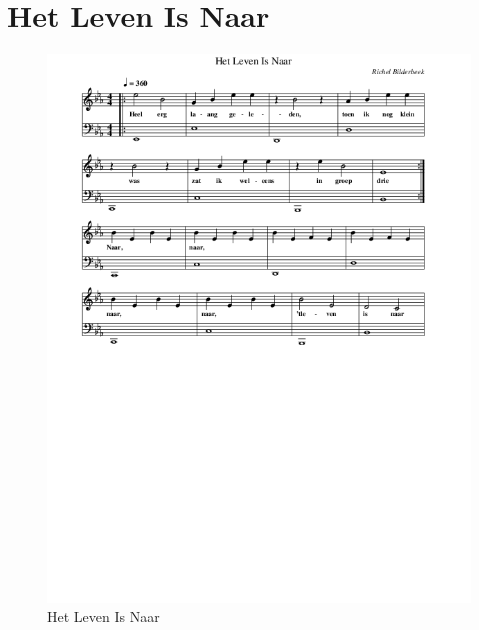 \section{Het Leven Is Naar}



\begin{figure}[!htbp]
  \includegraphics[width=\textwidth,height=\textheight,keepaspectratio]{../songs/18_het_leven_is_naar.png}
  \caption{Het Leven Is Naar}
  \label{fig:18_het_leven_is_naar}
\end{figure}
